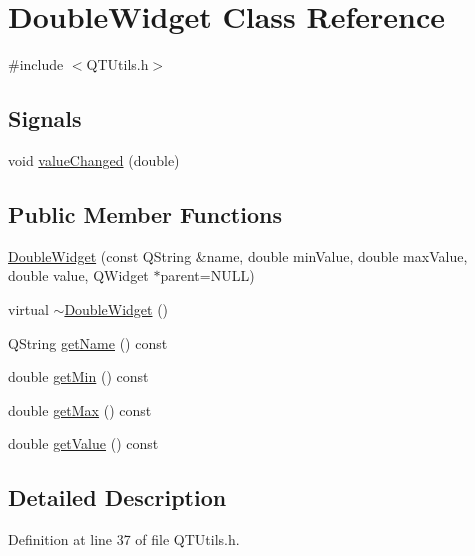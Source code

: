 \hypertarget{class_double_widget}{
\section{DoubleWidget Class Reference}
\label{class_double_widget}
}


{\ttfamily \#include $<$QTUtils.h$>$}

\subsection*{Signals}
\begin{DoxyCompactItemize}
\item 
void \hyperlink{class_double_widget_aff16cdb56a80413f6fed11fb4e8688e7}{valueChanged} (double)
\end{DoxyCompactItemize}
\subsection*{Public Member Functions}
\begin{DoxyCompactItemize}
\item 
\hyperlink{class_double_widget_a1a62088ea4e9de8f80e00e63c3ef0c7c}{DoubleWidget} (const QString \&name, double minValue, double maxValue, double value, QWidget $\ast$parent=NULL)
\item 
virtual \hyperlink{class_double_widget_ab9ff38df92e1715e71ceaa666de0deb2}{$\sim$DoubleWidget} ()
\item 
QString \hyperlink{class_double_widget_a10778974b446ccf03964b34bdc34781f}{getName} () const 
\item 
double \hyperlink{class_double_widget_a5477a5af309fe31e81504cf635f49a79}{getMin} () const 
\item 
double \hyperlink{class_double_widget_a31103ed9eea2412c6ed80e25b14df146}{getMax} () const 
\item 
double \hyperlink{class_double_widget_ab008347d48f2da125000f71729519fd7}{getValue} () const 
\end{DoxyCompactItemize}


\subsection{Detailed Description}


Definition at line 37 of file QTUtils.h.




